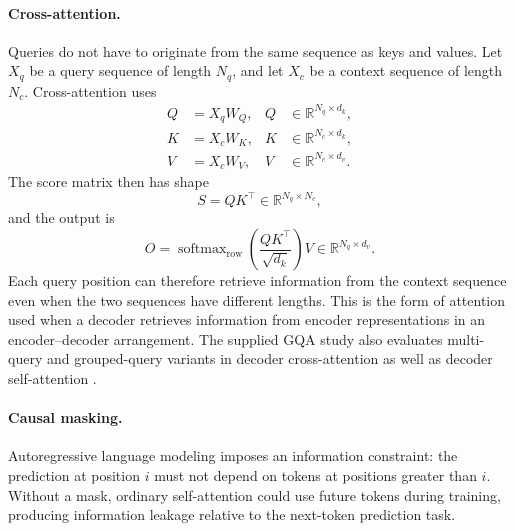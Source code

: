 \paragraph{Cross-attention.}
Queries do not have to originate from the same sequence as keys and values.
Let \(X_q\) be a query sequence of length \(N_q\), and let \(X_c\) be a
context sequence of length \(N_c\). Cross-attention uses
\begin{align}
    Q&=X_qW_Q,
    & Q&\in\mathbb{R}^{N_q\times d_k},
    \label{eq:attn-cross-query}\\
    K&=X_cW_K,
    & K&\in\mathbb{R}^{N_c\times d_k},
    \label{eq:attn-cross-key}\\
    V&=X_cW_V,
    & V&\in\mathbb{R}^{N_c\times d_v}.
    \label{eq:attn-cross-value}
\end{align}
The score matrix then has shape
\begin{equation}
    S=QK^\top
    \in\mathbb{R}^{N_q\times N_c},
    \label{eq:attn-cross-score-shape}
\end{equation}
and the output is
\begin{equation}
    O=
    \operatorname{softmax}_{\mathrm{row}}
    \left(
        \frac{QK^\top}{\sqrt{d_k}}
    \right)V
    \in\mathbb{R}^{N_q\times d_v}.
    \label{eq:attn-cross-output}
\end{equation}
Each query position can therefore retrieve information from the context
sequence even when the two sequences have different lengths. This is the
form of attention used when a decoder retrieves information from encoder
representations in an encoder--decoder arrangement. The supplied GQA study
also evaluates multi-query and grouped-query variants in decoder
cross-attention as well as decoder self-attention
\parencite{ainslie2023gqa}.

\paragraph{Causal masking.}
Autoregressive language modeling imposes an information constraint:
the prediction at position \(i\) must not depend on tokens at positions
greater than \(i\). Without a mask, ordinary self-attention could use
future tokens during training, producing information leakage relative to
the next-token prediction task.

